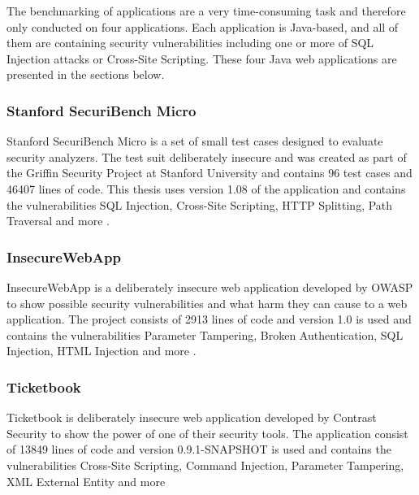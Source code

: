 The benchmarking of applications are a very time-consuming task and therefore only conducted on four applications. Each application is Java-based, and all of them are containing security vulnerabilities including one or more of SQL Injection attacks or Cross-Site Scripting. These four Java web applications are presented in the sections below.



\subsubsection{Stanford SecuriBench Micro}
Stanford SecuriBench Micro is a set of small test cases designed to evaluate security analyzers. The test suit deliberately insecure and was created as part of the Griffin Security Project \parencite{griffin} at Stanford University and contains 96 test cases and 46407 lines of code. This thesis uses version 1.08 of the application and contains the vulnerabilities SQL Injection, Cross-Site Scripting, HTTP Splitting, Path Traversal and more \parencite{securiBenchMicro, microfaq}. 



\subsubsection{InsecureWebApp}
InsecureWebApp is a deliberately insecure web application developed by OWASP to show possible security vulnerabilities and what harm they can cause to a web application. The project consists of 2913 lines of code and version 1.0 is used and contains the vulnerabilities Parameter Tampering, Broken Authentication, SQL Injection, HTML Injection and more \parencite{insecure}. 



\subsubsection{Ticketbook}
Ticketbook is deliberately insecure web application developed by Contrast Security to show the power of one of their security tools. The application consist of 13849 lines of code and version 0.9.1-SNAPSHOT is used and contains the vulnerabilities Cross-Site Scripting, Command Injection, Parameter Tampering, XML External Entity and more \parencite{ticketbook, contrast}



